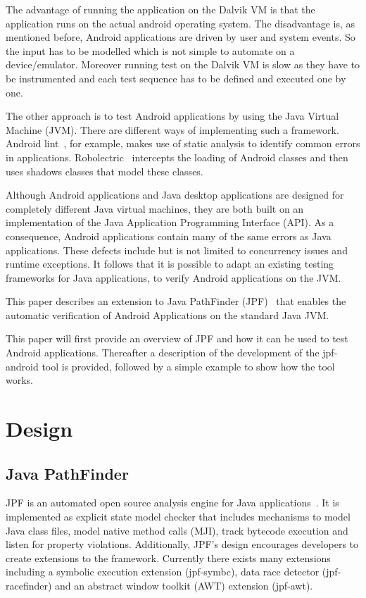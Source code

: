 \documentclass{sig-alternate}
\begin{document}
The advantage of running the application on the Dalvik VM is that the application runs on the actual android operating system. The
disadvantage is, as mentioned before, Android applications are driven by user and system events. So the input has to be modelled which is
not simple to
automate on a device/emulator. Moreover running test on the Dalvik VM is slow as they have to be instrumented and each test sequence has
to be defined and executed one by one. 
 
The other approach is to test Android applications by using the Java Virtual Machine (JVM). There are different ways of implementing such a
framework. Android
lint~\cite{lint}, for example, makes use of static analysis to identify common errors in applications. Robolectric~\cite{robolectric}
intercepts the loading of Android classes and then uses shadows classes that model these classes.

Although Android applications and Java desktop applications are designed for completely different Java virtual machines, they are both
built on an implementation of the Java Application Programming Interface (API). As a consequence, Android applications contain many of the
same errors as Java applications. These defects include but is not limited to concurrency issues and runtime exceptions. It follows that it
is possible to adapt an existing testing frameworks for Java applications, to verify Android applications on the JVM.

This paper describes an extension to Java PathFinder (JPF)~\cite{JPFDocs} that enables the automatic
verification of Android Applications on the standard Java JVM. 

This paper will first provide an overview of JPF and how it can be used to test Android applications. Thereafter a description of the
development of the jpf-android tool is provided, followed by a simple example to show how the tool works.


\section{Design}
\subsection{Java PathFinder}
JPF is an automated open source analysis engine for Java applications~\cite{JPFDocs}. It is implemented as explicit state model checker
that includes mechanisms to model Java class files, model native method calls (MJI), track bytecode execution and listen for
property violations. Additionally, JPF's design encourages developers to create extensions to the framework. Currently there exists many
extensions including a symbolic execution extension (jpf-symbc), data race
detector (jpf-racefinder) and an abstract window toolkit (AWT) extension (jpf-awt).
\end{document}
